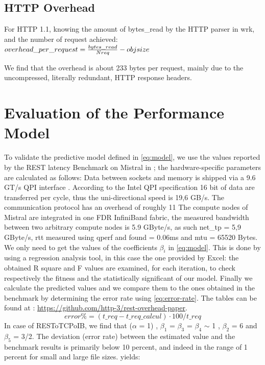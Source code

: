 \documentclass[runningheads]{llncs}
\begin{document}
\subsection{HTTP Overhead}

For HTTP 1.1, knowing the amount of bytes\_read by the HTTP parser in wrk, and the number of request achieved:
$ overhead\_per\_request=\frac{bytes\_read}{Nreq} - obj\-size $

We find that the overhead is about 233 bytes per request, mainly due to the uncompressed, literally redundant, HTTP response headers.
\section{Evaluation of the Performance Model} \label{sec:evaluation}
To validate the predictive model defined in \cref{eq:model}, we use the values reported by the REST latency Benchmark on Mistral in ; the hardware-specific parameters are calculated as follows:
Data between sockets and memory is shipped via a 9.6 GT/s QPI interface \cite{intel-xeon}. According to the Intel QPI specification \cite{intel-qpi} 16 bit of data are transferred per cycle, thus the uni-directional speed is 19,6 GB/s. The communication protocol has an overhead of roughly 11 %
The compute nodes of Mistral are integrated in one FDR InfiniBand fabric, the measured bandwidth between two arbitrary compute nodes is 5.9 GByte/s, as such net\_tp = 5,9 GByte/s, rtt measured using qperf and found = 0.06ms and mtu = 65520 Bytes.
We only need to get the values of the coefficients $\beta_i$ in \cref{eq:model}. This is done by using a regression analysis tool, in this case the one provided by Excel: the obtained R square and F values are examined, for each iteration, to check respectively the fitness and the statistically significant of our model. Finally we calculate the predicted values and we compare them to the ones obtained in the benchmark by determining the error rate using \cref{eq:error-rate}. The tables can be found at : \href{https://github.com/http-3/rest-overhead-paper}{https://github.com/http-3/rest-overhead-paper}.
\begin{equation}
 error\%=(t\_req -t\_req\_calcul)\cdot100/t\_req
\label{eq:error-rate}
\end{equation}
In case of RESToTCPoIB, we find that ($\alpha$ = 1) , $\beta_1$ = $\beta_3$ = $\beta_4$ $\sim$ 1 , $\beta_2$ = 6 and $\beta_5$ = 3/2.
The deviation (error rate) between the estimated value and the benchmark results is primarily below 10 percent, and indeed in the range of 1 percent for small and large file sizes. yields:
\end{document}
